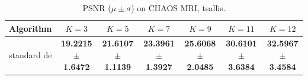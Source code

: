 \begin{table}[htbp]
\centering
\caption{PSNR ($\mu \pm \sigma$) on CHAOS MRI, tsallis.}
\label{tab:exp2-tsallis-psnr}
\begin{tabular}{lcccccc}
\toprule
Algorithm & $K=3$ & $K=5$ & $K=7$ & $K=9$ & $K=11$ & $K=12$ \\
\midrule
standard de & \textbf{19.2215 $\pm$ 1.6472} & \textbf{21.6107 $\pm$ 1.1139} & \textbf{23.3961 $\pm$ 1.3927} & \textbf{25.6068 $\pm$ 2.0485} & \textbf{30.6101 $\pm$ 3.6384} & \textbf{32.5967 $\pm$ 3.4584} \\
\bottomrule
\end{tabular}
\end{table}